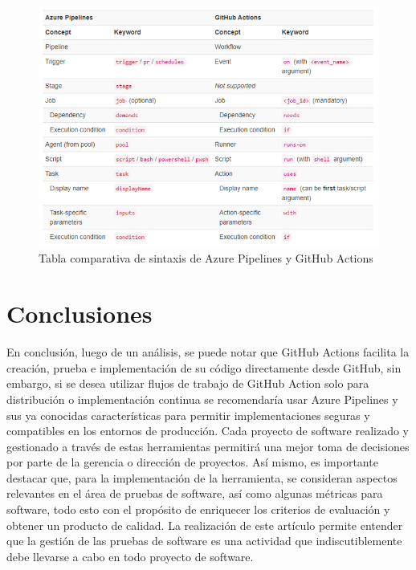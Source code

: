 \documentclass[twoside,twocolumn]{article}
\begin{document}
\begin{figure}[t]
    \begin{center}
        \includegraphics[width = \columnwidth]{./Imagenes/1 iwr4M9D-eSbMV8ki5xbU2w.png}
        \caption{Tabla comparativa de sintaxis de Azure Pipelines y GitHub Actions}
    \end{center}
\end{figure}


\newpage

\section{Conclusiones}

En conclusión, luego de un análisis, se puede notar que GitHub Actions facilita la creación, prueba e implementación de su código directamente desde GitHub, sin embargo, si se desea utilizar flujos de trabajo de GitHub Action solo para distribución o implementación continua se recomendaría usar Azure Pipelines y sus ya conocidas características para permitir implementaciones seguras y compatibles en los entornos de producción.
Cada proyecto de software realizado y gestionado a través de estas herramientas permitirá una mejor toma de decisiones por parte de la gerencia o dirección de proyectos.
Así mismo, es importante destacar que, para la implementación de la herramienta, se consideran aspectos relevantes en el área de pruebas de software, así como algunas métricas para software, todo esto con el propósito de enriquecer los criterios de evaluación y obtener un producto de calidad.
La realización de este artículo permite entender que la gestión de las pruebas de software es una actividad que indiscutiblemente debe llevarse a cabo en todo proyecto de software.
\end{document}
